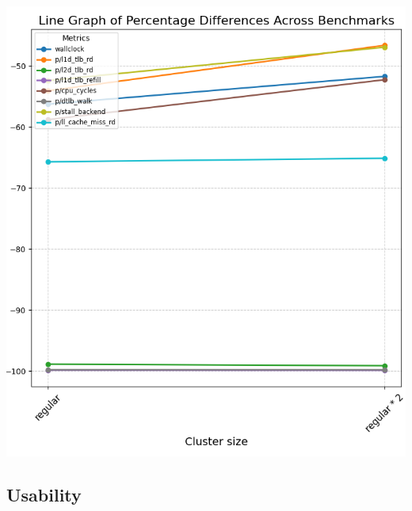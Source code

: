 \documentclass[11pt]{article}
\begin{document}
\begin{center}
\includegraphics[width=.9\linewidth]{./diagrams/glibc.png}
\end{center}

\subsection{Usability}
\label{sec:org3b91bbd}
\end{document}
